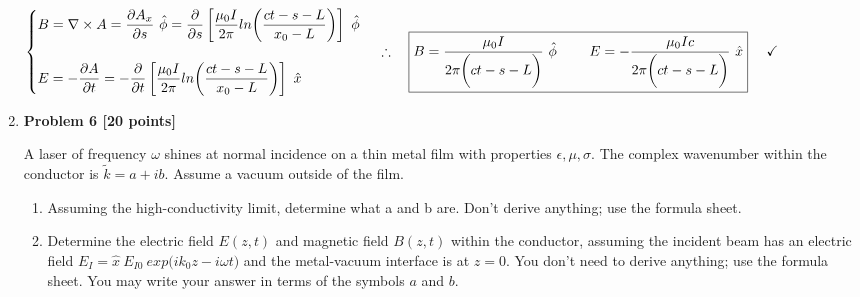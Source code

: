 \documentclass[fleqn]{article}
\begin{document}
\begin{enumerate}
{        $
          \begin{cases}
            B=\nabla \times A=\dfrac{\partial A_x}{\partial s} ~ \hat{\phi}=\dfrac{\partial}{\partial s} \left[\dfrac{\mu_0 I}{2 \pi} ln \bigg( \dfrac{ct-s-L}{x_0-L} \bigg) \right] ~ \hat{\phi}
            \\
            \\
            E=-\dfrac{\partial A}{\partial t}
            =-\dfrac{\partial}{\partial t} \left[\dfrac{\mu_0 I}{2 \pi} ln \bigg( \dfrac{ct-s-L}{x_0-L} \bigg)\right] ~ \hat{x}
          \end{cases}
          \\
          \\
          \\
          \\
          \therefore ~~~ \boxed{
            B=\dfrac{\mu_0 I}{2 \pi \bigg( ct-s-L \bigg)} ~ \hat{\phi}
            ~~~~~~~
            E=-\dfrac{\mu_0 I c}{2\pi \bigg( ct-s-L \bigg)} ~ \hat{x}
          } ~~~~ \checkmark
          \\
          \\
        $
      }

  \item \textbf{Problem 6 [20 points]}

  A laser of frequency $\omega$ shines at normal incidence on a thin metal film with properties $\epsilon, \mu, \sigma$. 
  The complex wavenumber within the conductor is $\tilde{k}= a + ib$. Assume a vacuum outside of the film.
    \begin{enumerate}
      \item Assuming the high-conductivity limit, determine what a and b are. Don't derive anything; use
      the formula sheet.


      \item Determine the electric field $E(z,t)$ and magnetic field $B(z,t)$ within the conductor, assuming
      the incident beam has an electric field $E_I= \hat{x} ~ E_{I0} ~ exp \bigg( i k_0 z - i \omega t \bigg)$ 
      and the metal-vacuum interface is at $z = 0$. You don't need to derive anything; use the formula sheet. 
      You may write your answer in terms of the symbols $a$ and $b$.


    \end{enumerate}

  \end{enumerate}
\end{document}
